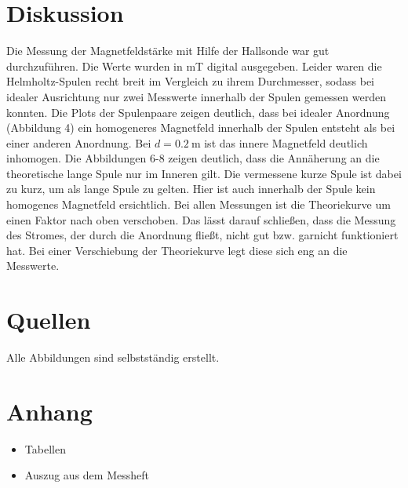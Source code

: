 \documentclass[11pt,ngerman,a4paper]{article}
\begin{document}
\section{Diskussion}
Die Messung der Magnetfeldstärke mit Hilfe der Hallsonde war gut durchzuführen. Die Werte wurden in mT digital ausgegeben.
\newline
Leider waren die Helmholtz-Spulen recht breit im Vergleich zu ihrem Durchmesser, sodass bei idealer Ausrichtung nur zwei Messwerte innerhalb der Spulen gemessen werden konnten.
Die Plots der Spulenpaare zeigen deutlich, dass bei idealer Anordnung (Abbildung 4) ein homogeneres Magnetfeld innerhalb der Spulen entsteht als bei einer anderen Anordnung. Bei $d = \SI{0.2}{\meter}$ ist das innere Magnetfeld deutlich inhomogen.
\newline
Die Abbildungen 6-8 zeigen deutlich, dass die Annäherung an die theoretische lange Spule nur im Inneren gilt. Die vermessene kurze Spule ist dabei zu kurz, um als lange Spule zu gelten. Hier ist auch innerhalb der Spule kein homogenes Magnetfeld ersichtlich.
\newline
Bei allen Messungen ist die Theoriekurve um einen Faktor nach oben verschoben. Das lässt darauf schließen, dass die Messung des Stromes, der durch die Anordnung fließt, nicht gut bzw. garnicht funktioniert hat. Bei einer Verschiebung der Theoriekurve legt diese sich eng an die Messwerte.

\section{Quellen}
Alle Abbildungen sind selbstständig erstellt.

\section{Anhang}
\begin{itemize}
\item Tabellen
\item Auszug aus dem Messheft
\end{itemize}
\newpage
\end{document}
